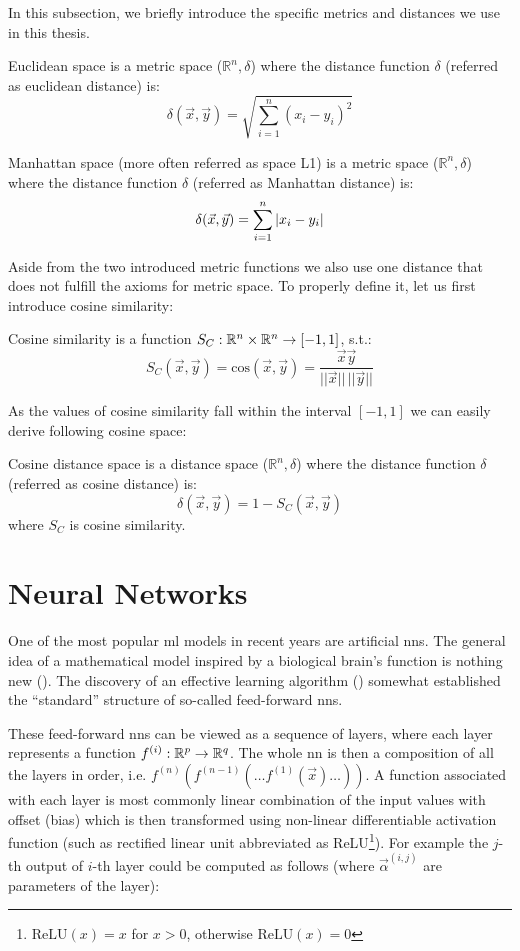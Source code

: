 In this subsection, we briefly introduce the specific metrics and distances we use in this thesis.

\begin{defn}
Euclidean space is a metric space ($\mathbb{R}^n, \delta$) where the
distance function $\delta$ (referred as euclidean distance) is:
$$\delta(\vec{x}, \vec{y}) = \sqrt{\sum_{i=1}^n(x_i - y_i)^2}$$
\end{defn}

\begin{defn}
Manhattan space (more often referred as space L1) is a metric
space ($\mathbb{R}^n, \delta$) where the
distance function $\delta$ (referred as Manhattan distance) is:
$$\delta(\vec{x}, \vec{y}) = \sum_{i=1}^n \left|{x_i - y_i}\right|$$
\end{defn}

Aside from the two introduced metric functions we also use one distance that does not fulfill the axioms for metric space. To properly define it, let us first introduce cosine similarity:

\begin{defn}
Cosine similarity is a function $S_C : \mathbb{R}^n \times \mathbb{R}^n \rightarrow [-1, 1]$, s.t.:
$$S_C(\vec{x}, \vec{y}) = \mathrm{cos}(\vec{x}, \vec{y}) = \frac{\vec{x}\vec{y}}{||\vec{x}||\,||\vec{y}||}$$
\end{defn}
As the values of cosine similarity fall within the interval $[-1,1]$ we can
easily derive following cosine space:
\begin{defn}
Cosine distance space is a distance space ($\mathbb{R}^n, \delta$) where the distance
function $\delta$ (referred as cosine distance) is:
$$\delta(\vec{x}, \vec{y}) = 1 - S_C(\vec{x}, \vec{y})$$
where $S_C$ is cosine similarity.
\end{defn}

\section{Neural Networks}
\label{sec:nn}

One of the most popular \gls{ml} models in recent years are artificial \glspl{nn}. The general idea of a mathematical model inspired by a biological brain's function is nothing new (\cite{first_nn}). The discovery of an effective learning algorithm (\cite{backprop}) somewhat established the ``standard'' structure of so-called feed-forward \glspl{nn}.

These feed-forward \glspl{nn} can be viewed as a sequence of layers, where each layer represents a function $f^{(i)}: \mathbb{R}^p \rightarrow \mathbb{R}^q$. The whole \gls{nn} is then a composition of all the layers in order, i.e. $f^{(n)}(f^{(n-1)}(\ldots f^{(1)}(\vec{x})\ldots))$. A function associated with each layer is most commonly linear combination of the input values with offset (bias) which is then transformed using non-linear differentiable activation function (such as rectified linear unit abbreviated as ReLU\footnote{$\mathrm{ReLU}(x) = x$ for $x > 0$, otherwise $\mathrm{ReLU}(x) = 0$}). For example the $j$-th output of $i$-th layer could be computed as follows (where $\vec{\alpha}^{(i,j)}$ are parameters of the layer):

